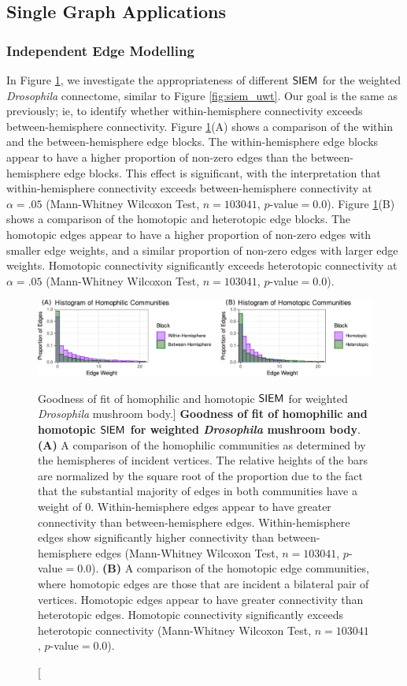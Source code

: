 \subsection{Single Graph Applications}\label{sec:single_app_appendix}
\subsubsection{Independent Edge Modelling}\label{sec:siem_wt}
In Figure \ref{fig:dros_siem}, we investigate the appropriateness of different $\operatorname{\mathsf{SIEM}}$ for the weighted \textit{Drosophila} connectome, similar to Figure \ref{fig:siem_uwt}.  Our goal is the same as previously; ie, to identify whether within-hemisphere connectivity exceeds between-hemisphere connectivity. Figure \ref{fig:dros_siem}(A) shows a comparison of the within and the between-hemisphere edge blocks. The within-hemisphere edge blocks appear to have a higher proportion of non-zero edges than the between-hemisphere edge blocks. This effect is significant, with the interpretation that within-hemisphere connectivity exceeds between-hemisphere connectivity at $\alpha=.05$ (Mann-Whitney Wilcoxon Test, $n=103041$, $p$-value$=0.0$). Figure \ref{fig:dros_siem}(B) shows a comparison of the homotopic and heterotopic edge blocks. The homotopic edges appear to have a higher proportion of non-zero edges with smaller edge weights, and a similar proportion of non-zero edges with larger edge weights. Homotopic connectivity significantly exceeds heterotopic connectivity at $\alpha=.05$ (Mann-Whitney Wilcoxon Test,  $n=103041$, $p$-value$=0.0$).

\begin{figure}
    \centering
    \includegraphics[width=\linewidth]{figures/dnd/dros_siem.pdf}
    \caption
    [Goodness of fit of homophilic and homotopic $\operatorname{\mathsf{SIEM}}$ for weighted \textit{Drosophila} mushroom body.]
    {\textbf{Goodness of fit of homophilic and homotopic $\operatorname{\mathsf{SIEM}}$ for weighted \textit{Drosophila} mushroom body}. \textbf{(A)} A comparison of the homophilic communities as determined by the hemispheres of incident vertices. The relative heights of the bars are normalized by the square root of the proportion due to the fact that the substantial majority of edges in both communities have a weight of $0$. Within-hemisphere edges appear to have greater connectivity than between-hemisphere edges. Within-hemisphere edges show significantly higher connectivity than between-hemisphere edges (Mann-Whitney Wilcoxon Test, $n=103041$, $p$-value$=0.0$). \textbf{(B)} A comparison of the homotopic edge communities, where homotopic edges are those that are incident a bilateral pair of vertices. Homotopic edges appear to have greater connectivity than heterotopic edges. Homotopic connectivity significantly exceeds heterotopic connectivity (Mann-Whitney Wilcoxon Test, $n=103041$, $p$-value$=0.0$).}
    \label{fig:dros_siem}
\end{figure}

